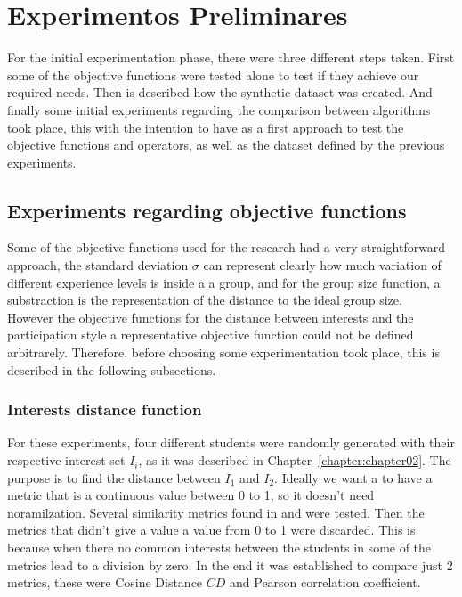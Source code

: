 \chapter{Experimentos Preliminares}
\label{chapter:chapter04}

For the initial experimentation phase, there were three different steps taken. First some of the objective functions were tested alone to test if they achieve our required needs. Then is described how the synthetic dataset was created. And finally some initial experiments regarding the comparison between algorithms took place, this with the intention to have as a first approach to test the objective functions and operators, as well as the dataset defined by the previous experiments.

\section{Experiments regarding objective functions}

Some of the objective functions used for the research had a very straightforward approach, the standard deviation $\sigma$ can represent clearly how much variation of different experience levels is inside a a group, and for the group size function, a substraction is the representation of the distance to the ideal group size.\\ 

However the objective functions for the distance between interests and the participation style a representative objective function could not be defined arbitrarely. Therefore, before choosing some experimentation took place, this is described in the following subsections.\\

\subsection{Interests distance function}

For these experiments, four different students were randomly generated with their respective interest set $I_i$, as it was described in Chapter~\ref{chapter:chapter02}. The purpose is to find the distance between $I_1$ and $I_2$. Ideally we want a to have a metric that is a continuous value between 0 to 1, so it doesn't need noramilzation. Several similarity metrics found in \cite{SeyedShirkhorshidi2015AData} and \cite{Sung-HyukChaComprehensiveFunctions} were tested. Then the metrics that didn't give a value a value from 0 to 1 were discarded. This is because when there no common interests between the students in some of the metrics lead to a division by zero. In the end it was established to compare just 2 metrics, these were Cosine Distance $CD$ and Pearson correlation coefficient.\\

